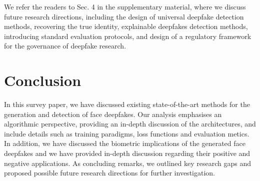 We refer the readers to Sec. 4 in the supplementary material, where we discuss future research directions, including the design of universal deepfake detection methods, recovering the true identity, explainable deepfakes detection methods, introducing standard evaluation protocols, and design of a regulatory framework for the governance of deepfake research. 

\section{Conclusion}\label{sec:conclusions}
In this survey paper, we have discussed existing state-of-the-art methods for the generation and detection of face deepfakes. Our analysis emphasises an algorithmic perspective, providing an in-depth discussion of the architectures, and include details such as training paradigms, loss functions and evaluation metics. 
In addition, we have discussed the biometric implications of the generated face deepfakes and we have provided in-depth discussion regarding their positive and negative applications. As concluding remarks, we outlined key research gaps and proposed possible future research directions for further investigation. 